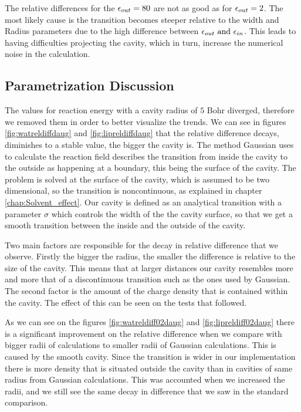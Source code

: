 \documentclass[../master_thesis.tex]{subfiles}
\begin{document}
The relative differences for the $\epsilon_{out} = 80$ are not as good as for $\epsilon_{out} = 2$.
The most likely cause is the transition becomes steeper relative
to the width and Radius parameters due to the high difference between $\epsilon_{out} \text{ and } \epsilon_{in}$.
This leads to \mrchem having difficulties projecting the cavity, which in turn,
increase the numerical noise in the calculation.

\subsection{Parametrization Discussion}
The values for  reaction energy with a cavity radius of $5$ Bohr diverged, therefore
we removed them in order to better visualize the trends.
We can see in figures \ref{fig:watreldiffdaug} and \ref{fig:lipreldiffdaug}
that the relative difference decays, diminishes to a stable value, the bigger the cavity is. The method Gaussian
uses to calculate the reaction field describes the transition from inside the
cavity to the outside as happening at a boundary, this being the surface of the cavity.
The problem is solved at the surface of the cavity, which is assumed to be two dimensional,
so the transition is noncontinuous, as explained in chapter \ref{chap:Solvent_effect}.
Our cavity is defined as an analytical transition with a parameter $\sigma$ which
controls the width of the the cavity surface, so that we get a smooth transition
between the inside and the outside of the cavity.

Two main factors are responsible for the decay in relative difference that we observe.
Firstly the bigger the radius, the smaller the difference is relative to the
size of the cavity. This means that at larger distances our cavity resembles
more and more that of a discontinuous transition such as the ones used by
Gaussian. The second factor is the amount of the charge density that is contained within
the cavity. The effect of this can be seen on the tests that followed.

As we can see on the figures \ref{fig:watreldiff02daug} and \ref{fig:lipreldiff02daug}
there is a significant improvement on the relative difference when we compare with
bigger radii of \mrchem calculations to smaller radii of Gaussian calculations.
This is caused by the smooth cavity. Since the transition is wider in our implementation
there is more density that is situated outside the cavity than in cavities of same radius
from Gaussian calculations. This was accounted when we increased the radii, and we still
see the same decay in difference that we saw in the standard comparison.
\end{document}
